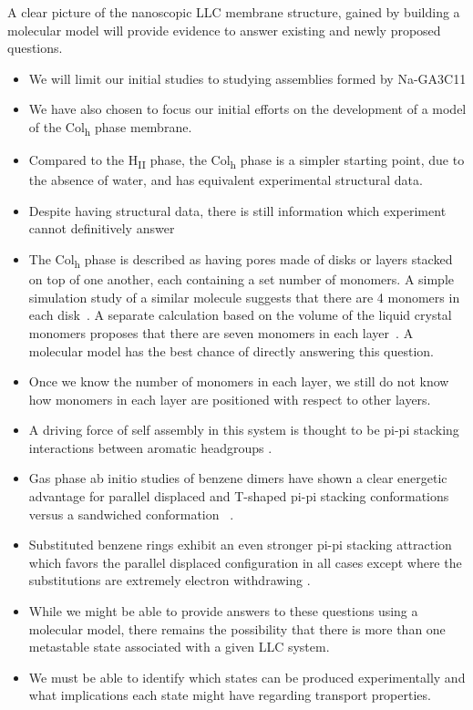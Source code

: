 \documentclass{article}
\begin{document}
  A clear picture of the nanoscopic LLC membrane structure, gained by building 
  a molecular model will provide evidence to answer existing and newly proposed
  questions.
  \begin{itemize}
    \item We will limit our initial studies to studying assemblies formed by Na-GA3C11
    \item We have also chosen to focus our initial efforts on the development of 
    a model of the Col\textsubscript{h} phase membrane.
    \item Compared to the H\textsubscript{II} phase, the Col\textsubscript{h}
    phase is a simpler starting point, due to the absence of water, and has
    equivalent experimental structural data.
    \item Despite having structural data, there is still information which 
    experiment cannot definitively answer
    \item The Col\textsubscript{h} phase is described as having pores made of
    disks or layers stacked on top of one another, each containing a set 
    number of monomers. A simple simulation study of a similar molecule suggests
    that there are 4 monomers in each disk~\cite{zhu_methacrylated_2006}. A 
    separate calculation based on the volume of the liquid crystal monomers proposes
    that there are seven monomers in each layer~\cite{resel_structural_2000}. 
    A molecular model has the best chance of directly answering this question.
    \item Once we know the number of monomers in each layer, we still do not know how 
    monomers in each layer are positioned with respect to other layers. 
    \item A driving force of self assembly in this system is thought to be pi-pi
    stacking interactions between aromatic headgroups \cite{gazit_possible_2002}. 
    \item Gas phase ab initio studies of benzene dimers have shown a clear energetic
    advantage for parallel displaced and T-shaped pi-pi stacking conformations versus a
    sandwiched conformation ~\cite{sinnokrot_estimates_2002}.
    \item Substituted benzene rings exhibit an even stronger pi-pi stacking 
    attraction which favors the parallel displaced configuration in all cases
    except where the substitutions are extremely electron withdrawing
    \cite{waller_hybrid_2006,ringer_effect_2006}.
    \item While we might be able to provide answers to these questions using a 
    molecular model, there remains the possibility that there is more than one 
    metastable state associated with a given LLC system.
    \item We must be able to identify which states can be produced experimentally
    and what implications each state might have regarding transport properties.
  \end{itemize}
    
\end{document}
